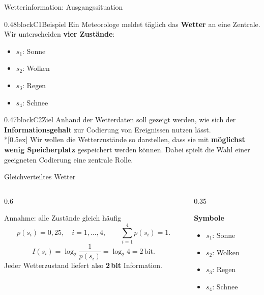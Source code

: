 \begin{frame}{Wetterinformation: Ausgangssituation}
\begin{blockrow}
  \begin{blockcol}{0.48\linewidth}{blockC1}{Beispiel}
    Ein Meteorologe meldet täglich das \textbf{Wetter} an eine Zentrale.
Wir unterscheiden  \textbf{vier Zustände}:
\begin{itemize}
  \item \(s_1\): Sonne
  \item \(s_2\): Wolken
  \item \(s_3\): Regen
  \item \(s_4\): Schnee
\end{itemize}
  \end{blockcol}

  \begin{blockcol}{0.47\linewidth}{blockC2}{Ziel}
Anhand der Wetterdaten soll gezeigt werden, wie sich der
\textbf{Informationsgehalt} zur Codierung von Ereignissen nutzen lässt.\\*[0.5ex]
Wir wollen die Wetterzustände so darstellen, dass sie mit
\textbf{möglichst wenig Speicherplatz} gespeichert werden können.
Dabei spielt die Wahl einer geeigneten Codierung eine zentrale Rolle.
  \end{blockcol}
\end{blockrow}
\end{frame}




\begin{frame}{Gleichverteiltes Wetter}

\begin{columns}

\begin{column}{0.6\textwidth}

\begin{block}{Annahme: alle Zustände gleich häufig}
\[
p(s_i) = 0{,}25,\quad i = 1,\dots,4, 
\qquad \sum_{i=1}^{4} p(s_i) = 1.
\]
\[
I(s_i) = \log_2 \frac{1}{p(s_i)} = \log_2 4 = 2\,\text{bit}.
\]
Jeder Wetterzustand liefert also \textbf{2\,bit} Information.
\end{block}

\end{column}

\begin{column}{0.35\textwidth}

\textbf{Symbole}
\begin{itemize}
  \item \(s_1\): Sonne
  \item \(s_2\): Wolken
  \item \(s_3\): Regen
  \item \(s_4\): Schnee
\end{itemize}

\end{column}

\end{columns}

\end{frame}

